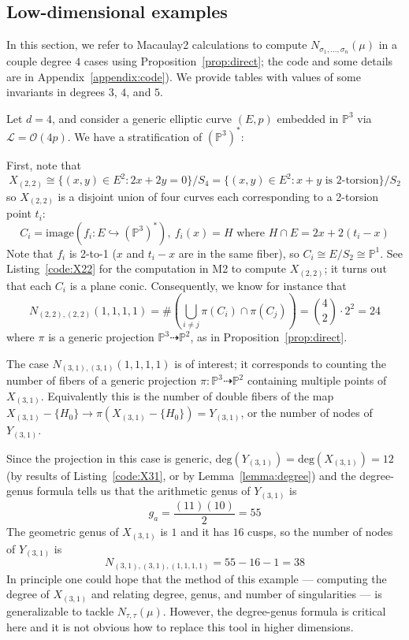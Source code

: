 \documentclass[11pt]{article}           %
\renewcommand{\P}{\mathbb P}
\theoremstyle{definition}
\begin{document}
\subsection{Low-dimensional examples}

In this section, we refer to Macaulay2 calculations to
compute $N_{\sigma_1,\dots,\sigma_n}(\mu)$ in a couple degree $4$ cases
using Proposition~\ref{prop:direct}; the
code and some details are in Appendix~\ref{appendix:code}). We provide tables with values of some invariants in degrees $3$, $4$, and $5$.

Let $d=4$, and consider a generic elliptic curve $(E,p)$ embedded in $\P^3$ via
$\mathcal L=\mathcal O(4p)$. We have a stratification of $(\P^3)^*$:


First, note that \[X_{(2,2)}\cong\{(x,y)\in E^2:2x+2y=0\}/S_4=\{(x,y)\in E^2:x+y\text{ is 2-torsion}\}/S_2\]
so $X_{(2,2)}$ is a disjoint union of four curves each corresponding to a 2-torsion point $t_i$:
\[
C_i=\text{image}(f_i:E\hookrightarrow(\P^3)^*),\ f_i(x)=H\text{ where }H\cap E=2x+2(t_i-x)
\]
Note that $f_i$ is 2-to-1 ($x$ and $t_i-x$ are in the same fiber), so $C_i\cong E/S_2\cong\P^1$. See Listing~\ref{code:X22} for the computation in M2 to compute $X_{(2,2)}$; it turns out that each $C_i$ is a plane conic. Consequently,
we know for instance that
\[
N_{(2,2),(2,2)}(1,1,1,1)=\#\left(\bigcup_{i\neq j}\pi(C_i)\cap \pi(C_j)\right)=\binom 42\cdot 2^2=24
\]
where $\pi$ is a generic projection $\P^3\dashrightarrow\P^2$, as in
Proposition~\ref{prop:direct}.

The case $N_{(3,1),(3,1)}(1,1,1,1)$ is of interest; it corresponds to counting
the number of fibers of a generic projection $\pi:\P^3\dashrightarrow\P^2$
containing multiple points of $X_{(3,1)}$. Equivalently this is the number of
double fibers of the map $X_{(3,1)}-\{H_0\}\to \pi(X_{(3,1)}-\{H_0\})=Y_{(3,1)}$, or the number of nodes of $Y_{(3,1)}$.

Since the projection in this case is generic, $\text{deg}(Y_{(3,1)})=\text{deg}(X_{(3,1)})=12$ (by results of Listing~\ref{code:X31}, or by Lemma~\ref{lemma:degree}) and the degree-genus formula tells us that the arithmetic genus
of $Y_{(3,1)}$ is
\[
g_a=\frac{(11)(10)}{2}=55
\]
The geometric genus of $X_{(3,1)}$ is $1$ and it has $16$ cusps,
so the number of nodes of $Y_{(3,1)}$ is%
\[
N_{(3,1),(3,1),(1,1,1,1)}=55-16-1=38
\]
In principle one could hope that the method of this example ---
computing the degree of $X_{(3,1)}$ and relating degree, genus, and
number of singularities
--- is generalizable to tackle $N_{\tau,\tau}(\mu)$. However, the degree-genus
formula is critical here and it is not obvious how to replace this tool in higher dimensions.
\end{document}
